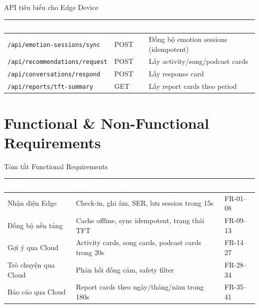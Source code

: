 \documentclass[12pt,aspectratio=169]{beamer}
\begin{document}
\begin{frame}{API tiêu biểu cho Edge Device}
  \small
  \begin{tabularx}{\textwidth}{Y L{1.8cm} Y}
  \toprule
  \textcolor{white}{\textbf{Endpoint}} & \textcolor{white}{\textbf{Method}} & \textcolor{white}{\textbf{Mục đích}} \\
  \midrule
  \texttt{/api/emotion-sessions/sync} & POST & Đồng bộ emotion sessions (idempotent) \\
  \texttt{/api/recommendations/request} & POST & Lấy activity/song/podcast cards \\
  \texttt{/api/conversations/respond} & POST & Lấy response card \\
  \texttt{/api/reports/tft-summary} & GET & Lấy report cards theo period \\
  \bottomrule
  \end{tabularx}
\end{frame}

\section{Functional \& Non-Functional Requirements}

\begin{frame}{Tóm tắt Functional Requirements}
  \small
  \begin{tabularx}{\textwidth}{L{3.2cm}Y L{2.0cm}}
  \toprule
  \textcolor{white}{\textbf{Nhóm}} & \textcolor{white}{\textbf{Nội dung chính}} & \textcolor{white}{\textbf{ID}} \\
  \midrule
  Nhận diện Edge & Check-in, ghi âm, SER, lưu session trong 15s & FR-01--08 \\
  Đồng bộ nền tảng & Cache offline, sync idempotent, trạng thái TFT & FR-09--13 \\
  Gợi ý qua Cloud & Activity cards, song cards, podcast cards trong 20s & FR-14--27 \\
  Trò chuyện qua Cloud & Phản hồi đồng cảm, safety filter & FR-28--34 \\
  Báo cáo qua Cloud & Report cards theo ngày/tháng/năm trong 180s & FR-35--41 \\
  \bottomrule
  \end{tabularx}
\end{frame}
\end{document}
